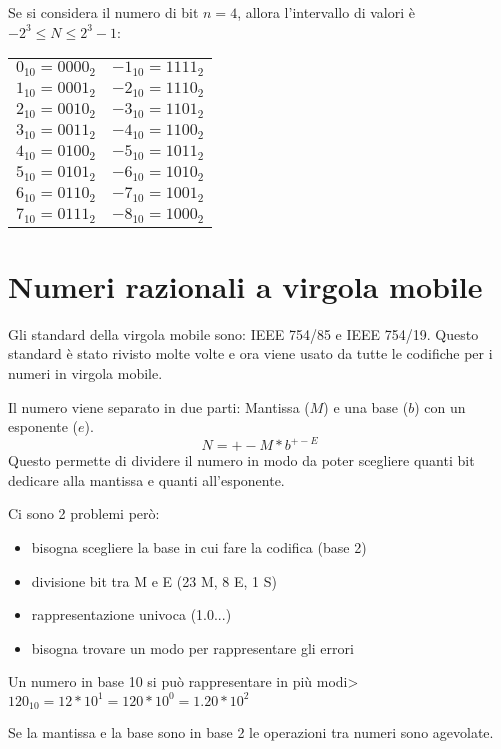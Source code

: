 \documentclass[a4paper]{article}
\theoremstyle{break}
\theoremstyle{break}
\theoremstyle{break}
\theoremstyle{break}
\theoremstyle{break}
\begin{document}
Se si considera il numero di bit \( n=4 \), allora l'intervallo di valori è
\( -2^3 \le N \le 2^3-1 \):

\begin{center}
	\begin{tabular}{c|c}
		\( 0_{10} = 0000_{2}\) & \( -1_{10} = 1111_{2}\) \\
		\( 1_{10} = 0001_{2}\) & \( -2_{10} = 1110_{2}\) \\
		\( 2_{10} = 0010_{2}\) & \( -3_{10} = 1101_{2}\) \\
		\( 3_{10} = 0011_{2}\) & \( -4_{10} = 1100_{2}\) \\
		\( 4_{10} = 0100_{2}\) & \( -5_{10} = 1011_{2}\) \\
		\( 5_{10} = 0101_{2}\) & \( -6_{10} = 1010_{2}\) \\
		\( 6_{10} = 0110_{2}\) & \( -7_{10} = 1001_{2}\) \\
		\( 7_{10} = 0111_{2}\) & \( -8_{10} = 1000_{2}\) \\
	\end{tabular}
\end{center}

\section{Numeri razionali a virgola mobile}
Gli standard della virgola mobile sono: IEEE 754/85 e IEEE 754/19. Questo standard
è stato rivisto molte volte e ora viene usato da tutte le codifiche per i numeri in
virgola mobile.

Il numero viene separato in due parti: Mantissa (\( M \)) e una base (\(b\))
con un esponente ($e$).
\[
	N = +- M * b^{+-E}
\]
Questo permette di dividere il numero in modo da poter scegliere quanti bit dedicare
alla mantissa e quanti all'esponente.

Ci sono 2 problemi però:
\begin{itemize}
	\item bisogna scegliere la base in cui fare la codifica (base 2)
	\item divisione bit tra M e E (23 M, 8 E, 1 S)
	\item rappresentazione univoca (1.0...)
	\item bisogna trovare un modo per rappresentare gli errori
\end{itemize}

Un numero in base 10 si può rappresentare in più modi>
\(120_{10} = 12*10^{1} = 120 * 10^{0} = 1.20 * 10^{2}\)

Se la mantissa e la base sono in base 2 le operazioni tra numeri sono agevolate.
\end{document}

